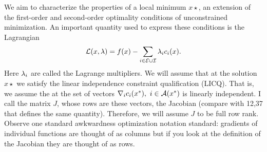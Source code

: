 \hop
We aim to characterize the properties of a local minimum $x\star$, an extension of the first-order and second-order optimality conditions of unconstrained minimization. An important quantity used to express these conditions is the Lagrangian
\begin{align}
    \mathcal{L} (x, \mathrm{\lambda}) = f(x) - \sum_{i \in \mathcal{E} \cup \mathcal{I}} \mathrm{\lambda}_i c_i(x). \label{lagrangian}
\end{align}
Here $\mathrm{\lambda}_i$ are called the Lagrange multipliers. We will assume that at the solution $x\star$ we satisfy the linear independence constraint qualification (LICQ). That is, we assume the at the set of vectors $\nabla_i c_i(x^*), \ i \in \mathcal{A}(x^*)$ is linearly independent. I call the matrix $J$, whose rows are these vectors, the Jacobian (compare with 12,37 that defines the same quantity). Therefore, we will assume $J$ to be full row rank. Observe one standard awkwardness optimization notation standard: gradients of individual functions are thought of as columns but if you look at the definition of the Jacobian they are thought of as rows.  

\newpage
